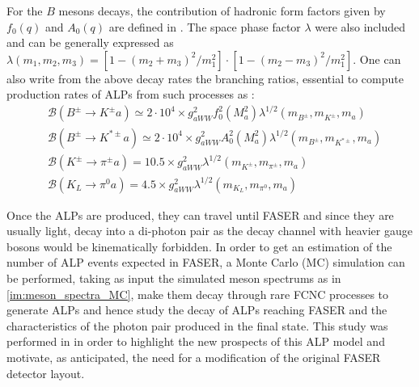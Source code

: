 		For the $B$ mesons decays, the contribution of hadronic form factors given by $f_0(q)$ and $A_0(q)$ are defined in \cite{ALPs_general}. The space phase factor $\lambda$ were also included and can be generally expressed as $\lambda(m_1, m_2, m_3) = \left[ 1- {(m_2 + m_3)^2}/{m_1^2} \right] \cdot \left[  1- {(m_2 - m_3)^2}/{m_1^2} \right]$. One can also write from the above decay rates the branching ratios, essential to compute production rates of ALPs from such processes as \cite{ALPs_general}:
		\begin{equation}
			\begin{split}
				& \mathcal{B}(B^\pm \rightarrow K^\pm a) \simeq 2\cdot 10^4 \times g_{aWW}^2 f_0^2(M_a^2) \lambda^{1/2}(m_{B^\pm}, m_{K^\pm}, m_a) \\
				& \mathcal{B}(B^\pm \rightarrow K^{*\pm} a) \simeq 2 \cdot 10^4 \times g_{aWW}^2 A_0^2(M_a^2) \lambda^{1/2}(m_{B^\pm}, m_{K^{*\pm}},m_a) \\
				& \mathcal{B}(K^\pm \rightarrow \pi^\pm a) = 10.5 \times g_{aWW}^2 \lambda^{1/2}(m_{K^\pm}, m_{\pi^\pm}, m_a) \\
				&\mathcal{B}(K_L \rightarrow \pi^0 a) = 4.5 \times g_{aWW}^2 \lambda^{1/2}(m_{K_L}, m_{\pi^0}, m_a)
			\end{split}
			\label{eq:BR_ALP}
		\end{equation}  
		
		Once the ALPs are produced, they can travel until FASER and since they are usually light, decay into a di-photon pair as the decay channel with heavier gauge bosons would be kinematically forbidden. In order to get an estimation of the number of ALP events expected in FASER, a Monte Carlo (MC) simulation can be performed, taking as input the simulated meson spectrums as in \ref{im:meson_spectra_MC}, make them decay through rare FCNC processes to generate ALPs and hence study the decay of ALPs reaching FASER and the characteristics of the photon pair produced in the final state. This study was performed in \cite{Moretti_MasterThesis} in order to highlight the new prospects of this ALP model and motivate, as anticipated, the need for a modification of the original FASER detector layout.     
		
